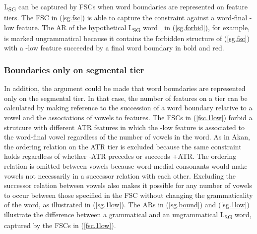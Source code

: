 \documentclass[,doc,floatsintext]{apa6}
\theoremstyle{definition}
\theoremstyle{definition}
\theoremstyle{definition}
\theoremstyle{remark}
\begin{document}
L\textsubscript{SG} can be captured by FSCs when word boundaries are
represented on feature tiers. The FSC in (\ref{sg.fsc}) is able to
capture the constraint against a word-final -low feature. The AR of the
hypothetical L\textsubscript{SG} word {[}\textipa{obIseI}{]} in
(\ref{sg.forbid}), for example, is marked ungrammatical because it
contains the forbidden structure of (\ref{sg.fsc}) with a -low feature
succeeded by a final word boundary in bold and red.

\subsubsection{Boundaries only on segmental
tier}\label{boundaries-only-on-segmental-tier}

In addition, the argument could be made that word boundaries are
represented only on the segmental tier. In that case, the number of
features on a tier can be calculated by making reference to the
succession of a word boundary relative to a vowel and the associations
of vowels to features. The FSCs in (\ref{fsc.1low}) forbid a strutcure
with different ATR features in which the -low feature is associated to
the word-final vowel regardless of the number of vowels in the word. As
in Akan, the ordering relation on the ATR tier is excluded because the
same constraint holds regardless of whether -ATR precedes or succeeds
+ATR. The ordering relation is omitted between vowels because
word-medial consonants would make vowels not necessarily in a successor
relation with each other. Excluding the successor relation between
vowels also makes it possible for any number of vowels to occur between
those specified in the FSC without changing the grammaticality of the
word, as illustrated in (\ref{sg.1low}). The ARs in (\ref{sg.bound}) and
(\ref{sg.1low}) illustrate the difference between a grammatical and an
ungrammatical L\textsubscript{SG} word, captured by the FSCs in
(\ref{fsc.1low}).
\end{document}
